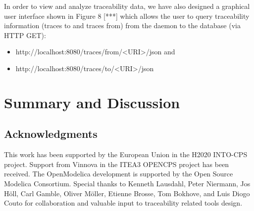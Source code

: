 In order to view and analyze traceability data, we have also designed a graphical user interface shown in
Figure 8 [***] which allows the user to query traceability information (traces to and traces from) from the
daemon to the database (via HTTP GET):

\begin{itemize}
\item http://localhost:8080/traces/from/<URI>/json and
\item http://localhost:8080/traces/to/<URI>/json 

\end{itemize}
 
\section{Summary and Discussion}
\label{sec:traceabilitysummary}


\subsection*{Acknowledgments}
\label{sec:traceabilityacknowledgments}

This work has been supported by the European Union in the H2020 INTO-CPS project. Support from
Vinnova in the ITEA3 OPENCPS project has been received. The OpenModelica development is supported
by the Open Source Modelica Consortium. Special thanks to Kenneth Lausdahl, Peter Niermann, Jos H\"{o}ll,
Carl Gamble, Oliver M\"{o}ller, Etienne Brosse, Tom Bokhove, and Luis Diogo Couto for collaboration and
valuable input to traceability related tools design.





